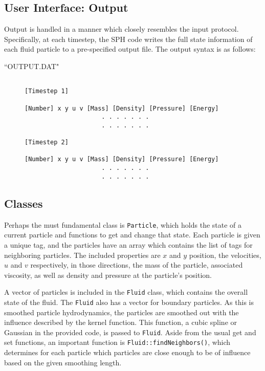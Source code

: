 \documentclass[11pt]{article}
\begin{document}
\subsection{User Interface: Output}

Output is handled in a manner which closely resembles the input protocol. Specifically, at each timestep, the SPH code writes the full state information of each fluid particle to a pre-specified output file. The output syntax is as follows:

\begin{description}
	\item[``OUTPUT.DAT"]
		\begin{verbatim}

[Timestep 1]

[Number] x y u v [Mass] [Density] [Pressure] [Energy]
                     . . . . . . .
                     . . . . . . .

[Timestep 2]

[Number] x y u v [Mass] [Density] [Pressure] [Energy]
                     . . . . . . .
                     . . . . . . .
		\end{verbatim}
\end{description}

\subsection{Classes} 
\label{Classes} 

Perhaps the must fundamental class is \texttt{Particle}, which holds the state
of a current particle and functions to get and change that state. Each particle
is given a unique tag, and the particles have an array which contains the list 
of tags for neighboring particles. The included properties are $x$ and $y$
position, the velocities, $u$ and $v$ respectively, in those directions, the
mass of the particle, associated viscosity, as well as density and pressure
at the particle's position.

A vector of particles is included in the \texttt{Fluid} class, which contains
the overall state of the fluid. The \texttt{Fluid} also has a vector for 
boundary particles. As this is smoothed particle hydrodynamics, the particles
are smoothed out with the influence described by the kernel function. This 
function, a cubic spline or Gaussian in the provided code, is passed to 
\texttt{Fluid}. Aside from the usual get and set functions, an important
function is \texttt{Fluid::findNeighbors()}, which determines for each particle
which particles are close enough to be of influence based on the given smoothing
length. 
\end{document}
